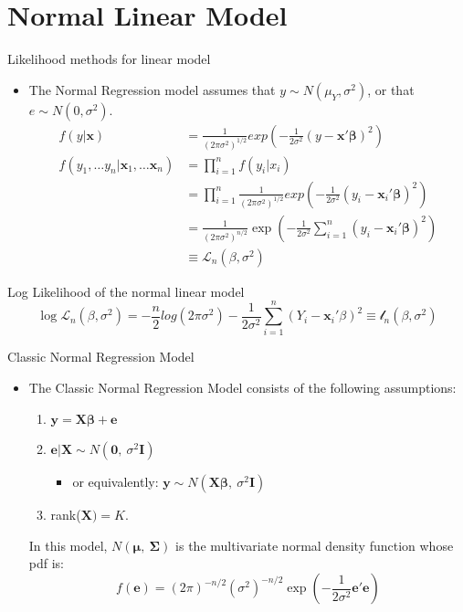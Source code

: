 \documentclass[aspectratio=169, handout, t]{beamer}
\numberwithin{equation}{section}
\begin{document}
\section{Normal Linear Model}

\begin{frame}{Likelihood methods for linear model}
\begin{itemize}
\item The Normal Regression model assumes that $y\sim N(\mu_Y, \sigma^2)$, or that $e\sim N(0, \sigma^2)$.
\begin{align*}
f(y|\bm{x})&=\frac{1}{(2\pi \sigma^2)^{1/2}}exp\left(-\frac{1}{2\sigma^2}(y-\bm{x}'\bm{\beta})^2\right)\\
f(y_1,\ldots y_n|\bm{x}_1,\ldots \bm{x}_n)&=\prod_{i=1}^n f(y_i|x_i)\\
&=\prod_{i=1}^n\frac{1}{(2\pi \sigma^2)^{1/2}}exp\left(-\frac{1}{2\sigma^2}(y_i-\bm{x}_i'\bm{\beta})^2\right)\\
&=\frac{1}{(2\pi \sigma^2)^{n/2}}\exp\left(-\frac{1}{2\sigma^2}\sum_{i=1}^n(y_i-\bm{x}_i'\bm{\beta})^2\right)\\
&\equiv \mathcal{L}_n(\beta, \sigma^2)
\end{align*}
\end{itemize}
\end{frame}

\begin{frame}{Log Likelihood of the normal linear model}
$$\log \mathcal{L}_n(\beta, \sigma^2) = -\frac{n}{2}log(2\pi \sigma^2)-\frac{1}{2\sigma^2}\sum_{i=1}^n (Y_i-\bm{x}_i'\beta)^2\equiv \mathcal{l}_n(\beta,\sigma^2)$$
\end{frame}



\begin{frame}{Classic Normal Regression Model}
\begin{itemize}
\item The Classic Normal Regression Model consists of the following assumptions:
\begin{enumerate}
\item $\bm{y}=\bm{X\beta}+\bm{e}$
\item $\bm{e}|\bm{X} \sim N(\bm{0},\ \sigma^2\bm{I})$
\begin{itemize}
\item or equivalently: $\bm{y}\sim N(\bm{X\beta},\ \sigma^2\bm{I})$
\end{itemize}
\item rank($\bm{X})=K$.
\end{enumerate}
In this model, $N(\bm{\mu},\ \bm{\Sigma})$ is the multivariate normal density function whose pdf is:
$$f(\bm{e})=(2\pi)^{-n/2}(\sigma^2)^{-n/2}\exp(-\frac{1}{2\sigma^2}\bm{e}'\bm{e})$$
\end{itemize}
\end{frame}
\end{document}
